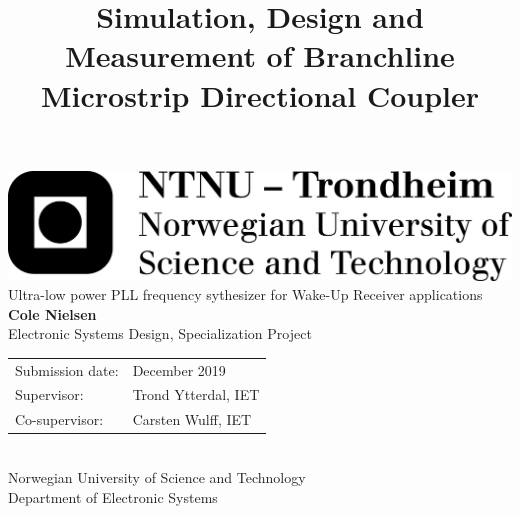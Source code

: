 \documentclass[10pt,a4paper]{article}
\title{\textbf{Simulation, Design and Measurement of Branchline \\ Microstrip Directional Coupler\\}}
\date{}
\makeatletter
\def \lineheight {1.5pt}
\def\vhrulefill#1{\leavevmode\leaders\hrule\@height#1\hfill \kern\z@}
\makeatother
\begin{document}
	
	\thispagestyle{firstpage}
	\fontfamily{\sfdefault}\selectfont 
	\includegraphics[width=0.5\linewidth]{logo_ntnu_eng_black.png} \\
	\vspace{8em}
	\huge Ultra-low power PLL frequency sythesizer for Wake-Up Receiver applications\\	
	\vspace{3em}
	\huge \textbf{Cole Nielsen}\\
	\vspace{14em}
	\large
	Electronic Systems Design, Specialization Project\\
	\vspace{4pt}
	\FloatBarrier

	\def\arraystretch{1.3}
	\setlength{\tabcolsep}{1em}
	\begin{tabular}{@{} l  l}
	Submission date: & December 2019\\
	Supervisor: & Trond Ytterdal, IET\\
	Co-supervisor: & Carsten Wulff, IET\\
	\end{tabular} \\
	\FloatBarrier
	\vspace{3em}
	Norwegian University of Science and Technology \\ 
	\vspace{4pt}Department of Electronic Systems\\
	
	\pagebreak
	\thispagestyle{blank}
	\null\pagebreak
\end{document}

